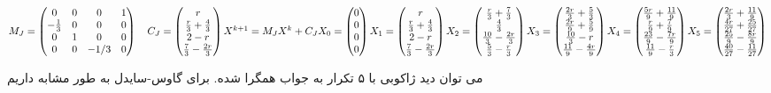 	\begin{center}
	$ 
	M_{J} = 
	\begin{pmatrix}
	0 & 0 & 0 & 1 \\ 
	- \frac{1}{3} & 0 & 0 & 0 \\ 
	0 & 1 & 0 & 0 \\ 
	0 & 0 & -1/3 & 0 
	\end{pmatrix}
	\quad 
	C_{J} = 
	\begin{pmatrix}
	r \\ 
	\frac{r}{3} + \frac{4}{3} \\ 
	2 - r \\ 
	\frac{7}{3} - \frac{2r}{3}
	\end{pmatrix} \linebreak
	X^{k+1} = M_JX^{k} + C_{J} \linebreak 
	X_0 = \begin{pmatrix} 0 \\ 0 \\ 0 \\ 0 \end{pmatrix} \linebreak 
	X_1 = 
	\begin{pmatrix}
	r \\ 
	\frac{r}{3} + \frac{4}{3} \\ 
	2 - r \\ 
	\frac{7}{3} - \frac{2r}{3}
	\end{pmatrix} \linebreak
	X_2 = 
	\begin{pmatrix}
	\frac{r}{3} + \frac{7}{3} \\ 
	\frac{4}{3} \\ 
	\frac{10}{3} - \frac{2r}{3} \\ 
	\frac{5}{3} - \frac{r}{3}
	\end{pmatrix} \linebreak
	X_3 = 
	\begin{pmatrix}
	\frac{2r}{3} + \frac{5}{3} \\ 
	\frac{2r}{9} + \frac{5}{9} \\ 
	\frac{10}{3} - r \\ 
	\frac{11}{9} - \frac{4r}{9}
	\end{pmatrix} \linebreak
	X_4 = 
	\begin{pmatrix}
	\frac{5r}{9} + \frac{11}{9} \\ 
	\frac{r}{9} + \frac{7}{9}\\ 
	\frac{23}{9} - \frac{7r}{9} \\ 
	\frac{11}{9} - \frac{r}{3}
	\end{pmatrix} \linebreak
	X_5 = 	
	\begin{pmatrix}
	\frac{2r}{3} + \frac{11}{9} \\ 
	\frac{4r}{27} + \frac{25}{27}\\ 
	\frac{25}{9} - \frac{8r}{9} \\ 
	\frac{40}{27} - \frac{11}{27}
	\end{pmatrix} \linebreak
	$
	\end{center}
می توان دید ژاکوبی با ۵ تکرار به جواب همگرا شده. برای گاوس-سایدل به طور مشابه داریم 

